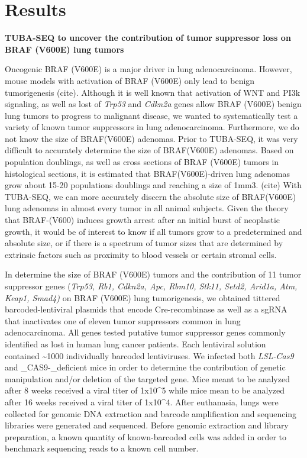 \hypertarget{results}{%
\section{Results}\label{results}}

\textbf{TUBA-SEQ to uncover the contribution of tumor suppressor loss on BRAF (V600E) lung tumors}

Oncogenic BRAF (V600E) is a major driver in lung adenocarcinoma. However, mouse models with activation of BRAF (V600E) only lead to benign tumorigenesis (cite). Although it is well known that activation of WNT and PI3k signaling, as well as lost of \emph{Trp53} and \emph{Cdkn2a} genes allow BRAF (V600E) benign lung tumors to progress to malignant disease, we wanted to systematically test a variety of known tumor suppressors in lung adenocarcinoma. Furthermore, we do not know the size of BRAF(V600E) adenomas. Prior to TUBA-SEQ, it was very difficult to accurately determine the size of BRAF(V600E) adenomas. Based on population doublings, as well as cross sections of BRAF (V600E) tumors in histological sections, it is estimated that BRAF(V600E)-driven lung adenomas grow about 15-20 populations doublings and reaching a size of 1mm3. (cite) With TUBA-SEQ, we can more accurately discern the absolute size of BRAF(V600E) lung adenomas in almost every tumor in all animal subjects. Given the theory that BRAF-(V600) induces growth arrest after an initial burst of neoplastic growth, it would be of interest to know if all tumors grow to a predetermined and absolute size, or if there is a spectrum of tumor sizes that are determined by extrinsic factors such as proximity to blood vessels or certain stromal cells.

In determine the size of BRAF (V600E) tumors and the contribution of 11 tumor suppressor genes (\emph{Trp53, Rb1, Cdkn2a, Apc, Rbm10, Stk11, Setd2, Arid1a, Atm, Keap1, Smad4)} on BRAF (V600E) lung tumorigenesis, we obtained tittered barcoded-lentiviral plasmids that encode Cre-recombinase as well as a sgRNA that inactivates one of eleven tumor suppressors common in lung adenocarcinoma. All genes tested putative tumor suppressor genes commonly identified as lost in human lung cancer patients. Each lentiviral solution contained \textasciitilde1000 individually barcoded lentiviruses. We infected both \emph{LSL-Cas9} and \_CAS9-\_deficient mice in order to determine the contribution of genetic manipulation and/or deletion of the targeted gene. Mice meant to be analyzed after 8 weeks received a viral titer of 1x10\^{}5 while mice mean to be analyzed after 16 weeks received a viral titer of 1x10\^{}4. After euthanasia, lungs were collected for genomic DNA extraction and barcode amplification and sequencing libraries were generated and sequenced. Before genomic extraction and library preparation, a known quantity of known-barcoded cells was added in order to benchmark sequencing reads to a known cell number.

